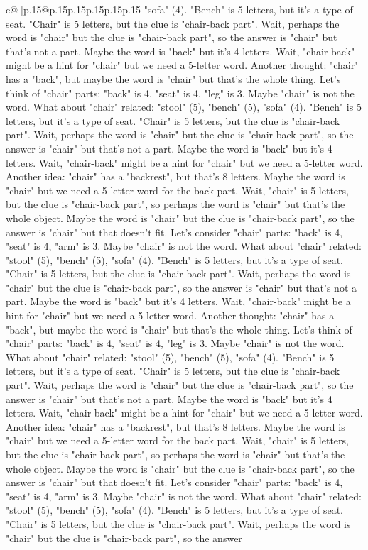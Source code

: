 \documentclass{article}
\begin{document}
{\begin{supertabular}{c@{$\;$}|p{.15\linewidth}@{}p{.15\linewidth}p{.15\linewidth}p{.15\linewidth}p{.15\linewidth}p{.15\linewidth}}
{{{"sofa" (4). "Bench" is 5 letters, but it's a type of seat. "Chair" is 5 letters, but the clue is "chair{-}back part". Wait, perhaps the word is "chair" but the clue is "chair{-}back part", so the answer is "chair" but that's not a part. Maybe the word is "back" but it's 4 letters. Wait, "chair{-}back" might be a hint for "chair" but we need a 5{-}letter word. Another thought: "chair" has a "back", but maybe the word is "chair" but that's the whole thing. Let's think of "chair" parts: "back" is 4, "seat" is 4, "leg" is 3. Maybe "chair" is not the word. What about "chair" related: "stool" (5), "bench" (5), "sofa" (4). "Bench" is 5 letters, but it's a type of seat. "Chair" is 5 letters, but the clue is "chair{-}back part". Wait, perhaps the word is "chair" but the clue is "chair{-}back part", so the answer is "chair" but that's not a part. Maybe the word is "back" but it's 4 letters. Wait, "chair{-}back" might be a hint for "chair" but we need a 5{-}letter word. Another idea: "chair" has a "backrest", but that's 8 letters. Maybe the word is "chair" but we need a 5{-}letter word for the back part. Wait, "chair" is 5 letters, but the clue is "chair{-}back part", so perhaps the word is "chair" but that's the whole object. Maybe the word is "chair" but the clue is "chair{-}back part", so the answer is "chair" but that doesn't fit. Let's consider "chair" parts: "back" is 4, "seat" is 4, "arm" is 3. Maybe "chair" is not the word. What about "chair" related: "stool" (5), "bench" (5), "sofa" (4). "Bench" is 5 letters, but it's a type of seat. "Chair" is 5 letters, but the clue is "chair{-}back part". Wait, perhaps the word is "chair" but the clue is "chair{-}back part", so the answer is "chair" but that's not a part. Maybe the word is "back" but it's 4 letters. Wait, "chair{-}back" might be a hint for "chair" but we need a 5{-}letter word. Another thought: "chair" has a "back", but maybe the word is "chair" but that's the whole thing. Let's think of "chair" parts: "back" is 4, "seat" is 4, "leg" is 3. Maybe "chair" is not the word. What about "chair" related: "stool" (5), "bench" (5), "sofa" (4). "Bench" is 5 letters, but it's a type of seat. "Chair" is 5 letters, but the clue is "chair{-}back part". Wait, perhaps the word is "chair" but the clue is "chair{-}back part", so the answer is "chair" but that's not a part. Maybe the word is "back" but it's 4 letters. Wait, "chair{-}back" might be a hint for "chair" but we need a 5{-}letter word. Another idea: "chair" has a "backrest", but that's 8 letters. Maybe the word is "chair" but we need a 5{-}letter word for the back part. Wait, "chair" is 5 letters, but the clue is "chair{-}back part", so perhaps the word is "chair" but that's the whole object. Maybe the word is "chair" but the clue is "chair{-}back part", so the answer is "chair" but that doesn't fit. Let's consider "chair" parts: "back" is 4, "seat" is 4, "arm" is 3. Maybe "chair" is not the word. What about "chair" related: "stool" (5), "bench" (5), "sofa" (4). "Bench" is 5 letters, but it's a type of seat. "Chair" is 5 letters, but the clue is "chair{-}back part". Wait, perhaps the word is "chair" but the clue is "chair{-}back part", so the answer }}}
\end{supertabular}}
\end{document}
